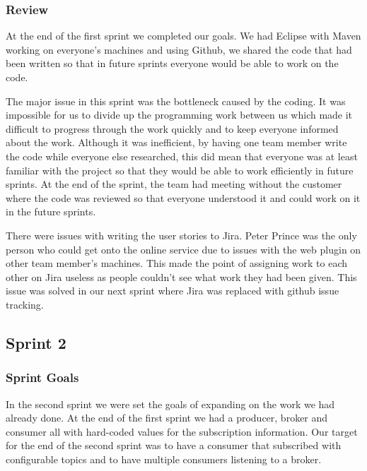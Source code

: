 \documentclass[a4paper, 12pt]{article}
\begin{document}
\subsubsection{Review}

At the end of the first sprint we completed our goals. We had Eclipse with Maven working on everyone's machines and using Github, we shared the code that had been written so that in future sprints everyone would be able to work on the code.

The major issue in this sprint was the bottleneck caused by the coding. It was impossible for us to divide up the programming work between us which made it difficult to progress through the work quickly and to keep everyone informed about the work. Although it was inefficient, by having one team member write the code while everyone else researched, this did mean that everyone was at least familiar with the project so that they would be able to work efficiently in future sprints. At the end of the sprint, the team had meeting without the customer where the code was reviewed so that everyone understood it and could work on it in the future sprints.

There were issues with writing the user stories to Jira. Peter Prince was the only person who could get onto the online service due to issues with the web plugin on other team member's machines. This made the point of assigning work to each other on Jira useless as people couldn't see what work they had been given. This issue was solved in our next sprint where Jira was replaced with github issue tracking.


\subsection{Sprint 2}

\subsubsection{Sprint Goals}

In the second sprint we were set the goals of expanding on the work we had already done. At the end of the first sprint we had a producer, broker and consumer all with hard-coded values for the subscription information. Our target for the end of the second sprint was to have a consumer that subscribed with configurable topics and to have multiple consumers listening to a broker.
\end{document}
